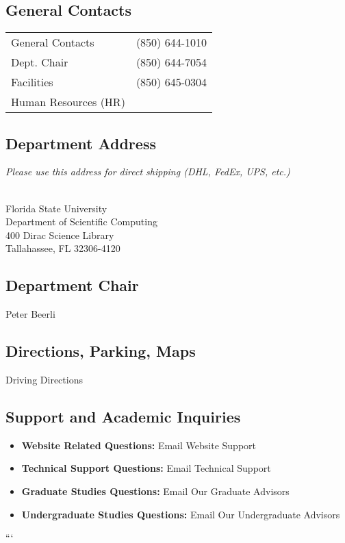 \documentclass[12pt,a4paper]{article}
\begin{document}
\subsection{General Contacts}
\begin{tabular}{@{}ll}
    General Contacts & (850) 644-1010 \\
    Dept. Chair      & (850) 644-7054 \\
    Facilities       & (850) 645-0304 \\
    Human Resources (HR) & \\
\end{tabular}

\subsection{Department Address}
\textit{Please use this address for direct shipping (DHL, FedEx, UPS, etc.)}
\vspace{1em}

 \\
Florida State University \\
Department of Scientific Computing \\
400 Dirac Science Library \\
Tallahassee, FL 32306-4120

\subsection{Department Chair}
Peter Beerli

\subsection{Directions, Parking, Maps}
\noindent Driving Directions

\subsection{Support and Academic Inquiries}
\begin{itemize}
    \item \textbf{Website Related Questions:} Email Website Support
    \item \textbf{Technical Support Questions:} Email Technical Support
    \item \textbf{Graduate Studies Questions:} Email Our Graduate Advisors
    \item \textbf{Undergraduate Studies Questions:} Email Our Undergraduate Advisors
\end{itemize}
```
\end{document}
